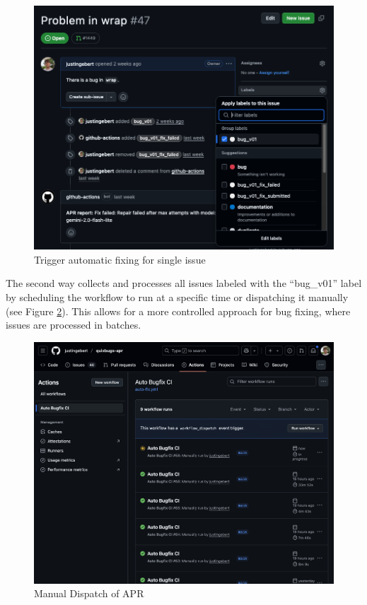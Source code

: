 \begin{figure}[H]
    \centering
    \includegraphics[width=1\textwidth]{images/workflow/label_issue.png}
    \caption{Trigger automatic fixing for single issue}
    \label{fig:issue-trigger}
\end{figure}

The second way collects and processes all issues labeled with the ``bug\_v01'' label by scheduling the workflow to run at a specific time or dispatching it manually (see Figure \ref{fig:dispatch}). This allows for a more controlled approach for bug fixing, where issues are processed in batches.

\begin{figure}[H]
    \centering
    \includegraphics[width=1\textwidth]{images/workflow/manual_dispatch.png}
    \caption{Manual Dispatch of APR}
    \label{fig:dispatch}
\end{figure}

